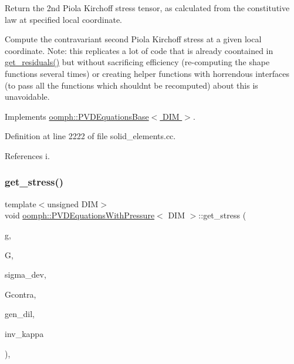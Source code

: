 Return the 2nd Piola Kirchoff stress tensor, as calculated from the constitutive law at specified local coordinate. 

Compute the contravariant second Piola Kirchoff stress at a given local coordinate. Note\+: this replicates a lot of code that is already coontained in \hyperlink{classoomph_1_1GeneralisedElement_a53d348ab71c86b53619129a1dd411d30}{get\+\_\+residuals()} but without sacrificing efficiency (re-\/computing the shape functions several times) or creating helper functions with horrendous interfaces (to pass all the functions which shouldn\textquotesingle{}t be recomputed) about this is unavoidable. 

Implements \hyperlink{classoomph_1_1PVDEquationsBase_ad429d68f0129d5f7a38705aab386daa5}{oomph\+::\+P\+V\+D\+Equations\+Base$<$ D\+I\+M $>$}.



Definition at line 2222 of file solid\+\_\+elements.\+cc.



References i.

\mbox{\label{classoomph_1_1PVDEquationsWithPressure_a4ae331361c8fd63725a55050e90e9e2d}} 
\subsubsection{\texorpdfstring{get\+\_\+stress()}{get\_stress()}\hspace{0.1cm}{\footnotesize\ttfamily [2/3]}}
{\footnotesize\ttfamily template$<$unsigned D\+IM$>$ \\
void \hyperlink{classoomph_1_1PVDEquationsWithPressure}{oomph\+::\+P\+V\+D\+Equations\+With\+Pressure}$<$ D\+IM $>$\+::get\+\_\+stress (\begin{DoxyParamCaption}\item[{const \hyperlink{classoomph_1_1DenseMatrix}{Dense\+Matrix}$<$ double $>$ \&}]{g,  }\item[{const \hyperlink{classoomph_1_1DenseMatrix}{Dense\+Matrix}$<$ double $>$ \&}]{G,  }\item[{\hyperlink{classoomph_1_1DenseMatrix}{Dense\+Matrix}$<$ double $>$ \&}]{sigma\+\_\+dev,  }\item[{\hyperlink{classoomph_1_1DenseMatrix}{Dense\+Matrix}$<$ double $>$ \&}]{Gcontra,  }\item[{double \&}]{gen\+\_\+dil,  }\item[{double \&}]{inv\+\_\+kappa }\end{DoxyParamCaption})\hspace{0.3cm}{\ttfamily [inline]}, {\ttfamily [protected]}}



